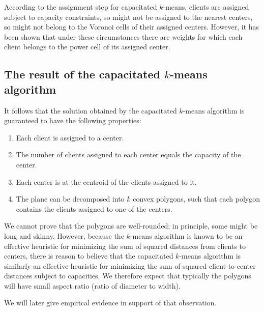According to the assignment step for capacitated $k$-means,
clients are assigned subject to capacity constraints, so might not be
assigned to the nearest centers, so might not belong to the Voronoi
cells of their assigned centers.  However, it has been shown that
under these circumstances there are weights for which each client
belongs to the power cell of its assigned center.

\subsection{The result of the capacitated $k$-means algorithm}

It follows that the solution obtained by the capacitated $k$-means
algorithm is guaranteed to have the following properties:
\begin{enumerate}
\item Each client is assigned to a center.
\item The number of clients assigned to each center equals the
  capacity of the center.
\item Each center is at the centroid of the clients assigned to it.
\item The plane can be decomposed into $k$ convex polygons, such that
  each polygon contains the clients assigned to one of the centers.
\end{enumerate}
We cannot prove that the polygons are well-rounded; in principle, some
might be long and skinny.  However, because the $k$-means algorithm is
known to be an effective heuristic for minimizing the sum of squared
distances from clients to centers, there is reason to believe that the
capacitated $k$-means algorithm is similarly an effective heuristic
for minimizing the sum of squared client-to-center distances subject
to capacities.  We therefore expect that typically the polygons will
have small aspect ratio (ratio of diameter to width).

We will later give empirical evidence in support of that observation.

